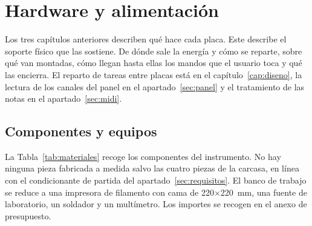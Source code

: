 \chapter{Hardware y alimentación}
\label{cap:hardware}

Los tres capítulos anteriores describen qué hace cada placa. Este describe el
soporte físico que las sostiene. De dónde sale la energía y cómo se reparte,
sobre qué van montadas, cómo llegan hasta ellas los mandos que el usuario toca
y qué las encierra. El reparto de tareas entre placas está en el
capítulo~\ref{cap:diseno}, la lectura de los canales del panel en el
apartado~\ref{sec:panel} y el tratamiento de las notas en el
apartado~\ref{sec:midi}.

\section{Componentes y equipos}
\label{sec:materiales}

La Tabla~\ref{tab:materiales} recoge los componentes del instrumento. No hay
ninguna pieza fabricada a medida salvo las cuatro piezas de la carcasa, en
línea con el condicionante de partida del apartado~\ref{sec:requisitos}. El
banco de trabajo se reduce a una impresora de filamento con cama de
220$\times$220~mm, una fuente de laboratorio, un soldador y un
multímetro. Los importes se recogen en el anexo de presupuesto.

